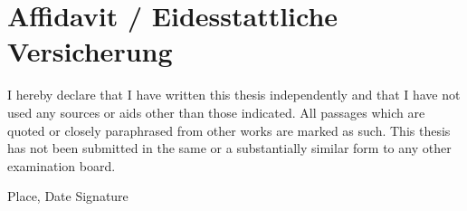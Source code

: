 \chapter*{Affidavit / Eidesstattliche Versicherung}
I hereby declare that I have written this thesis independently and that I have not used
any sources or aids other than those indicated. All passages which are quoted or closely
paraphrased from other works are marked as such. This thesis has not been submitted in
the same or a substantially similar form to any other examination board.

\vspace{2cm}
\noindent Place, Date \hfill Signature
